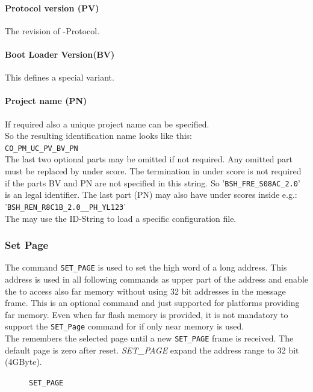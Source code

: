 \paragraph{Protocol version (PV)}
The revision of \bl{}-Protocol.

\paragraph{Boot Loader Version(BV)} This defines a special \bl{} variant.

\paragraph{Project name (PN)}If required also a unique project name can be specified.\\

\vspace{1ex}
\noindent{}So the resulting identification name looks like this:\\
\texttt{CO_PM_UC_PV_BV_PN}\\[1ex]
The last two optional parts may be omitted if not required. Any omitted part must be replaced by under score. The termination in under score is not required if the parts BV and PN are not specified in this string. So \mbox{'\texttt{BSH_FRE_S08AC_2.0}'} is an legal identifier. The last part (PN) may also have under scores inside e.g.:\\
\mbox{'\texttt{BSH_REN_R8C1B_2.0__PH_YL123}'}\\
The \fp{} may use the ID-String to load a specific configuration file.

\subsubsection{Set Page}
\label{sec:CmdSetPage}
The command \texttt{SET_PAGE} is used to set the high word of a long address. This address is used in all following commands as upper part of the address and enable the \bl{} to access also far memory without using 32 bit addresses in the message frame. This is an optional command and just supported for platforms providing far memory. Even when far flash memory is provided, it is not mandatory to support the \texttt{SET_Page} command for \bro{} if only near memory is used.\\
The \bl{} remembers the selected page until a new \texttt{SET_PAGE} frame is received. The default page is zero after reset. \emph{SET_PAGE} expand the address range to 32 bit (4GByte). 
\begin{figure}[h]
\begin{center}
\caption{\texttt{SET_PAGE}}
\label{fig:CmdSetPage}
\end{center}
\end{figure}




